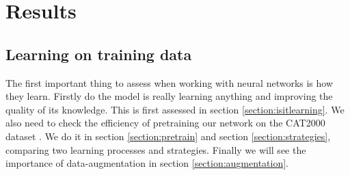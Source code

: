 \chapter{Results}

\section{Learning on training data}

The first important thing to assess when working with neural networks is how they learn. Firstly do the model is really learning anything and improving the quality of its knowledge. This is first assessed in section \ref{section:isitlearning}. We also need to check the efficiency of pretraining our network on the CAT2000 dataset  \cite{DBLP:journals/corr/BorjiI15}. We do it in section \ref{section:pretrain} and section \ref{section:strategies}, comparing two learning processes and strategies. Finally we will see the importance of data-augmentation in section \ref{section:augmentation}.

